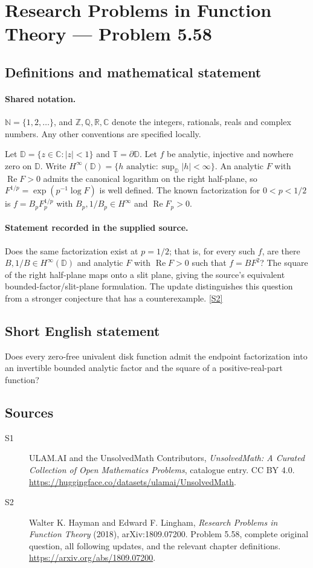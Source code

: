 \documentclass[11pt]{book}
\newcommand{\sref}[2]{\hyperlink{source:#1:#2}{[S#2]}}
\begin{document}
\section{Research Problems in Function Theory — Problem 5.58}\label{statement}

\subsection{Definitions and mathematical statement}

\paragraph{Shared notation.}$\mathbb N=\{1,2,\ldots\}$, and $\mathbb Z,\mathbb Q,\mathbb R,\mathbb C$ denote the integers, rationals, reals and complex numbers. Any other conventions are specified locally.


Let $\mathbb D=\{z\in\mathbb C:|z|<1\}$ and $\mathbb T=\partial\mathbb D$. Let $f$ be analytic, injective and nowhere zero on $\mathbb D$. Write $H^{\infty}(\mathbb D)=\{h\text{ analytic}:\sup_{\mathbb D}|h|<\infty\}$. An analytic $F$ with $\operatorname{Re}F>0$ admits the canonical logarithm on the right half-plane, so $F^{1/p}=\exp(p^{-1}\log F)$ is well defined. The known factorization for $0<p<1/2$ is $f=B_pF_p^{1/p}$ with $B_p,1/B_p\in H^{\infty}$ and $\operatorname{Re}F_p>0$.
\paragraph{Statement recorded in the supplied source.}
Does the same factorization exist at $p=1/2$; that is, for every such $f$, are there $B,1/B\in H^{\infty}(\mathbb D)$ and analytic $F$ with $\operatorname{Re}F>0$ such that $f=BF^2$? The square of the right half-plane maps onto a slit plane, giving the source’s equivalent bounded-factor/slit-plane formulation. The update distinguishes this question from a stronger conjecture that has a counterexample. \sref{statement}{2}
\subsection{Short English statement}
Does every zero-free univalent disk function admit the endpoint factorization into an invertible bounded analytic factor and the square of a positive-real-part function?
\subsection{Sources}
\begin{description}
\item[\hypertarget{source:statement:1}{S1}] ULAM.AI and the UnsolvedMath Contributors, \emph{UnsolvedMath: A Curated Collection of Open Mathematics Problems}, catalogue entry. CC BY 4.0. \url{https://huggingface.co/datasets/ulamai/UnsolvedMath}.
\item[\hypertarget{source:statement:2}{S2}] Walter K. Hayman and Edward F. Lingham, \emph{Research Problems in Function Theory} (2018), arXiv:1809.07200. Problem 5.58, complete original question, all following updates, and the relevant chapter definitions. \url{https://arxiv.org/abs/1809.07200}.
\end{description}
\label{end:statement}
\end{document}
